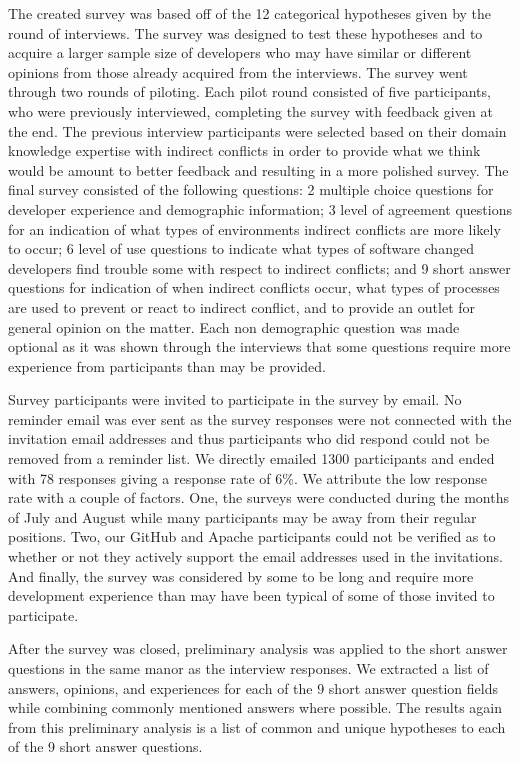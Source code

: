 \documentclass[conference]{IEEEtran}
\begin{document}
The created survey was based off of the 12 categorical hypotheses given by the round of interviews. The survey
was designed to test these hypotheses and to acquire a larger sample size of developers who may have similar
or different opinions from those already acquired from the interviews. The survey went through two rounds of
piloting. Each pilot round consisted of five participants, who were previously interviewed, completing the survey
with feedback given at the end. The previous interview participants were selected based on their domain knowledge
expertise with indirect conflicts in order to provide what we think would be amount to better feedback and resulting
in a more polished survey. The final survey consisted of the following questions:
2 multiple choice questions for developer experience and demographic information; 3 level of agreement questions for an indication of
what types of environments indirect conflicts are more likely to occur;
6 level of use questions to indicate what types of software changed developers find trouble some with respect to
indirect conflicts; and 9 short answer questions for indication of when indirect conflicts occur, what types of
processes are used to prevent or react to indirect conflict, and to provide an outlet for general opinion
on the matter. Each non demographic question was made optional as it was shown 
through the interviews that some questions require more experience from participants than may be provided.

Survey participants were invited to participate in the survey by email. No reminder email was ever sent as the
survey responses were not connected with the invitation email addresses and thus participants who did respond
could not be removed from a reminder list. We directly emailed 1300 participants and ended with 78 responses
giving a response rate of 6\%. We attribute the low response rate with a couple of factors. One, the surveys
were conducted during the months of July and August while many participants may be away from their regular positions.
Two, our GitHub and Apache participants could not be verified as to whether or not they actively support the
email addresses used in the invitations. And finally, the survey was considered by some to be long and require
more development experience than may have been typical of some of those invited to participate.

After the survey was closed, preliminary analysis was applied to the short answer questions in the same manor
as the interview responses. We extracted a list of answers, opinions, and experiences for each of the 9 short
answer question fields while combining commonly mentioned answers where possible. The results again from this
preliminary analysis is a list of common and unique hypotheses to each of the 9 short answer questions.
\end{document}
